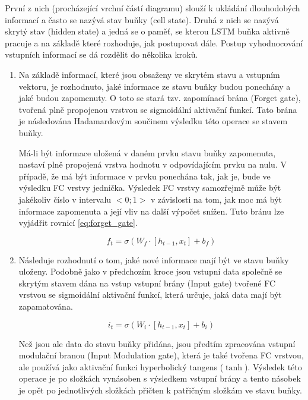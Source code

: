 První z nich (procházející vrchní částí diagramu) slouží k ukládání dlouhodobých informací a často se nazývá stav buňky (cell state). Druhá z nich se nazývá skrytý stav (hidden state) a jedná se o paměť, se kterou LSTM buňka aktivně pracuje a na základě které rozhoduje, jak postupovat dále.
Postup vyhodnocování vstupních informací se dá rozdělit do několika kroků.

\begin{enumerate}

\item Na základě informací, které jsou obsaženy ve skrytém stavu a vstupním vektoru, je rozhodnuto, jaké informace ze stavu buňky budou ponechány a jaké budou zapomenuty.
O toto se stará tzv. zapomínací brána (Forget gate), tvořená plně propojenou vrstvou se sigmoidální aktivační funkcí.
Tato brána je následována Hadamardovým součinem výsledku této operace se stavem buňky.

Má-li být informace uložená v daném prvku stavu buňky zapomenuta, nastaví plně propojená vrstva hodnotu v odpovídajícím prvku na nulu.
V případě, že má být informace v prvku ponechána tak, jak je, bude ve výsledku FC vrstvy jednička.
Výsledek FC vrstvy samozřejmě může být jakékoliv číslo v intervalu \(<0;1>\) v závislosti na tom, jak moc má být informace zapomenuta a její vliv na další výpočet snížen.
Tuto bránu lze vyjádřit rovnicí \ref{eq:forget_gate}. 

\begin{equation}
f_t = \sigma(W_f \cdot [h_{t-1}, x_t] + b_f)
\label{eq:forget_gate}
\end{equation}


\item Následuje rozhodnutí o tom, jaké nové informace mají být ve stavu buňky uloženy.
Podobně jako v předchozím kroce jsou vstupní data společně se skrytým stavem dána na vstup vstupní brány (Input gate) tvořené FC vrstvou se sigmoidální aktivační funkcí, která určuje, jaká data mají být zapamatována.

\begin{equation}
i_t = \sigma(W_i \cdot [h_{t-1}, x_t] + b_i)
\label{eq:input gate}
\end{equation}

Než jsou ale data do stavu buňky přidána, jsou předtím zpracována vstupní modulační branou (Input Modulation gate), která je také tvořena FC vrstvou, ale používá jako aktivační funkci hyperbolický tangens (\(\tanh\)).
Výsledek této operace je po složkách vynásoben s výsledkem vstupní brány a tento násobek je opět po jednotlivých složkách přičten k patřičným složkám ve stavu buňky.


\end{enumerate}
